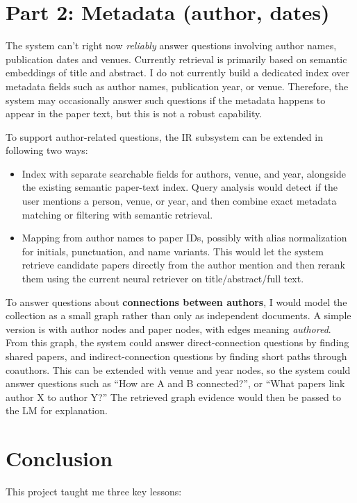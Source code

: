 \documentclass[a4paper,11pt]{article}
\begin{document}
\clearpage
\section*{Part 2: Metadata (author, dates)}
The system can't right now \emph{reliably} answer questions involving author names, publication dates and venues. Currently retrieval is primarily based on semantic embeddings of title and abstract. I do not currently build a dedicated index over metadata fields such as author names, publication year, or venue. Therefore, the system may occasionally answer such questions if the metadata happens to appear in the paper text, but this is not a robust capability.

To support author-related questions, the IR subsystem can be extended in following two ways:

\begin{itemize}
\item Index with separate searchable fields for authors, venue, and year, alongside the existing semantic paper-text index. Query analysis would detect if the user mentions a person, venue, or year, and then combine exact metadata matching or filtering with semantic retrieval.
\item Mapping from author names to paper IDs, possibly with alias normalization for initials, punctuation, and name variants. This would let the system retrieve candidate papers directly from the author mention and then rerank them using the current neural retriever on title/abstract/full text.
\end{itemize}

To answer questions about \textbf{connections between authors}, I would model the collection as a small graph rather than only as independent documents. A simple version is with author nodes and paper nodes, with edges meaning \emph{authored}. From this graph, the system could answer direct-connection questions by finding shared papers, and indirect-connection questions by finding short paths through coauthors. This can be extended with venue and year nodes, so the system could answer questions such as ``How are A and B connected?'', or ``What papers link author X to author Y?'' The retrieved graph evidence would then be passed to the LM for explanation.

\newpage
\section*{Conclusion}
This project taught me three key lessons:
\end{document}
